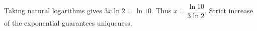 Taking natural logarithms gives $3x\ln2=\ln10$. Thus $\boxed{x=\dfrac{\ln10}{3\ln2}}$. Strict increase of the exponential guarantees uniqueness.
